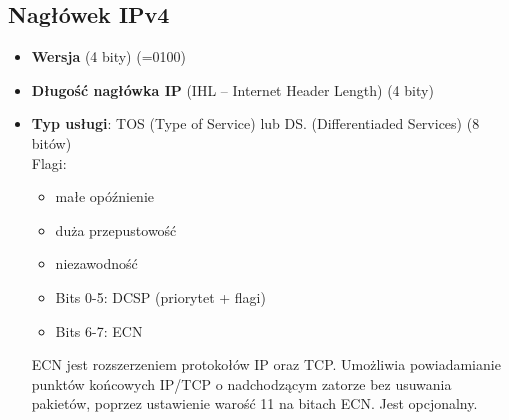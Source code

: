 \documentclass[../main.tex]{subfiles}
\begin{document}
    \subsection{Nagłówek IPv4}
    \begin{itemize}
        \item \textbf{Wersja} (4 bity) (=0100)
        \item \textbf{Długość nagłówka IP} (IHL – Internet Header Length) (4 bity)
        \item \textbf{Typ usługi}: TOS (Type of Service) lub DS. (Differentiaded Services) (8 bitów)\\
        Flagi:
        \begin{itemize}
            \item małe opóźnienie
            \item duża przepustowość
            \item niezawodność
        \end{itemize}
        \begin{itemize}
            \item Bits 0-5: DCSP (priorytet + flagi)
            \item Bits 6-7: ECN
        \end{itemize}
        ECN jest rozszerzeniem protokołów IP oraz TCP. Umożliwia powiadamianie punktów końcowych IP/TCP o nadchodzącym zatorze bez usuwania pakietów, poprzez ustawienie warość 11 na bitach ECN. Jest opcjonalny.


\end{itemize}
\end{document}
